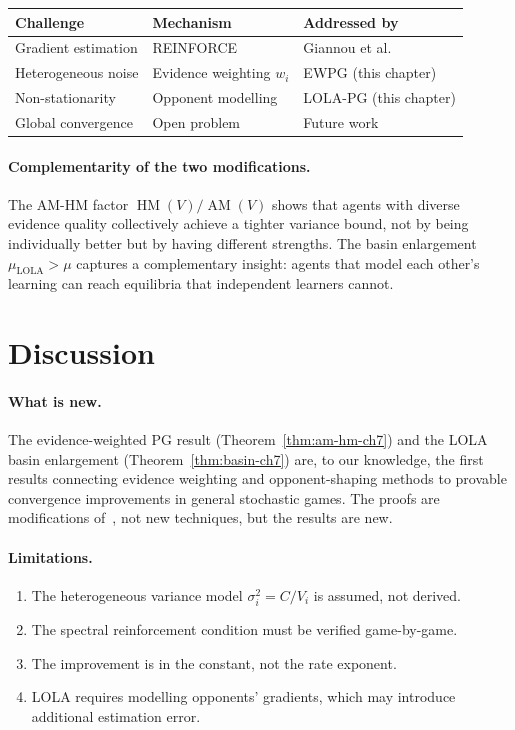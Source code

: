 \begin{center}
\renewcommand{\arraystretch}{1.3}
\begin{tabular}{lll}
\hline
\textbf{Challenge} & \textbf{Mechanism} & \textbf{Addressed by} \\
\hline
Gradient estimation & REINFORCE & Giannou et al.~\cite{giannou2022} \\
Heterogeneous noise & Evidence weighting $w_i$ & EWPG (this chapter) \\
Non-stationarity & Opponent modelling & LOLA-PG (this chapter) \\
Global convergence & Open problem & Future work \\
\hline
\end{tabular}
\end{center}

\paragraph{Complementarity of the two modifications.} The AM-HM factor $\operatorname{HM}(V)/\operatorname{AM}(V)$ shows that agents with diverse evidence quality collectively achieve a tighter variance bound, not by being individually better but by having different strengths. The basin enlargement $\mu_{\mathrm{LOLA}} > \mu$ captures a complementary insight: agents that model each other's learning can reach equilibria that independent learners cannot.


\section{Discussion}
\label{sec:discussion-ch7}

\paragraph{What is new.} The evidence-weighted PG result (Theorem~\ref{thm:am-hm-ch7}) and the LOLA basin enlargement (Theorem~\ref{thm:basin-ch7}) are, to our knowledge, the first results connecting evidence weighting and opponent-shaping methods to provable convergence improvements in general stochastic games. The proofs are modifications of~\cite{giannou2022}, not new techniques, but the results are new.

\paragraph{Limitations.}
\begin{enumerate}
    \item The heterogeneous variance model $\sigma_i^2 = C/V_i$ is assumed, not derived.
    \item The spectral reinforcement condition must be verified game-by-game.
    \item The improvement is in the constant, not the rate exponent.
    \item LOLA requires modelling opponents' gradients, which may introduce additional estimation error.
\end{enumerate}

